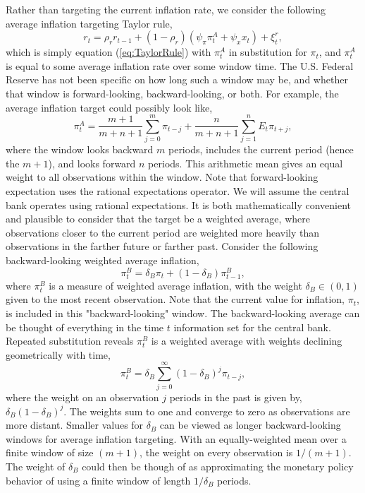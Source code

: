 \documentclass[12pt]{article}
\begin{document}
Rather than targeting the current inflation rate, we consider the following average inflation targeting Taylor rule,
\begin{equation}\label{eq:TaylorRuleAIT}
  r_t = \rho_r r_{t-1} + (1-\rho_r) \left( \psi_\pi \pi_t^A + \psi_x x_t \right) + \xi_t^{r},
\end{equation}
which is simply equation (\ref{eq:TaylorRule}) with $\pi_t^A$ in substitution for $\pi_t$, and $\pi_t^A$ is equal to some average inflation rate over some window time. The U.S. Federal Reserve has not been specific on how long such a window may be, and whether that window is forward-looking, backward-looking, or both. For example, the average inflation target could possibly look like,
\begin{equation}\label{eq:ait}
  \pi_t^A = \frac{m+1}{m+n+1}\sum_{j=0}^{m} \pi_{t-j} + \frac{n}{m+n+1}\sum_{j=1}^{n} E_t \pi_{t+j},
\end{equation}
where the window looks backward $m$ periods, includes the current period (hence the $m+1$), and looks forward $n$ periods.  This arithmetic mean gives an equal weight to all observations within the window. Note that forward-looking expectation uses the rational expectations operator. We will assume the central bank operates using rational expectations. It is both mathematically convenient and plausible to consider that the target be a weighted average, where observations closer to the current period are weighted more heavily than observations in the farther future or farther past. Consider the following backward-looking weighted average inflation,
\begin{equation}\label{eq:backward}
  \pi_t^B = \delta_B \pi_t + (1-\delta_B) \pi_{t-1}^B,
\end{equation}
where $\pi_t^B$ is a measure of weighted average inflation, with the weight $\delta_B \in (0,1)$ given to the most recent observation. Note that the current value for inflation, $\pi_t$, is included in this "backward-looking" window. The backward-looking average can be thought of everything in the time $t$ information set for the central bank. Repeated substitution reveals $\pi_t^B$ is a weighted average with weights declining geometrically with time,
\begin{equation}\label{eq:backward_all}
  \pi_t^B = \delta_B \sum_{j=0}^{\infty} (1-\delta_B)^j \pi_{t-j},
\end{equation}
where the weight on an observation $j$ periods in the past is given by, $\delta_B (1-\delta_B)^j$. The weights sum to one and converge to zero as observations are more distant. Smaller values for $\delta_B$ can be viewed as longer backward-looking windows for average inflation targeting. With an equally-weighted mean over a finite window of size $(m+1)$, the weight on every observation is $1/(m+1)$. The weight of $\delta_B$ could then be though of as approximating the monetary policy behavior of using a finite window of length $1 / \delta_B$ periods.
\end{document}
